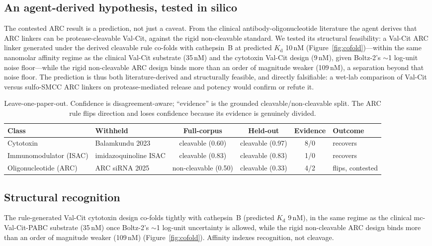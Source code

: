 \documentclass[10pt]{article}
\begin{document}
\subsection{An agent-derived hypothesis, tested in silico}
The contested ARC result is a prediction, not just a caveat. From the clinical antibody-oligonucleotide literature the agent derives that ARC linkers can be protease-cleavable Val-Cit, against the rigid non-cleavable standard. We tested its structural feasibility: a Val-Cit ARC linker generated under the derived cleavable rule co-folds with cathepsin~B at predicted $K_\mathrm{d}$ 10\,nM (Figure~\ref{fig:cofold})---within the same nanomolar affinity regime as the clinical Val-Cit substrate (35\,nM) and the cytotoxin Val-Cit design (9\,nM), given Boltz-2's $\sim$1 log-unit noise floor---while the rigid non-cleavable ARC design binds more than an order of magnitude weaker (109\,nM), a separation beyond that noise floor. The prediction is thus both literature-derived and structurally feasible, and directly falsifiable: a wet-lab comparison of Val-Cit versus sulfo-SMCC ARC linkers on protease-mediated release and potency would confirm or refute it.

\begin{table}[t]\centering\caption{Leave-one-paper-out. Confidence is disagreement-aware; ``evidence'' is the grounded cleavable/non-cleavable split. The ARC rule flips direction and loses confidence because its evidence is genuinely divided.}\label{tab:heldout}\footnotesize
\setlength{\tabcolsep}{4pt}
\begin{tabular}{l l c c c l}\toprule
Class & Withheld & Full-corpus & Held-out & Evidence & Outcome \\ \midrule
Cytotoxin & Balamkundu 2023 & cleavable (0.60) & cleavable (0.97) & 8/0 & recovers \\
Immunomodulator (ISAC) & imidazoquinoline ISAC & cleavable (0.83) & cleavable (0.83) & 1/0 & recovers \\
Oligonucleotide (ARC) & ARC siRNA 2025 & non-cleavable (0.50) & cleavable (0.33) & 4/2 & flips, contested \\
\bottomrule\end{tabular}\end{table}

\subsection{Structural recognition}
The rule-generated Val-Cit cytotoxin design co-folds tightly with cathepsin~B (predicted $K_\mathrm{d}$ 9\,nM), in the same regime as the clinical mc-Val-Cit-PABC substrate (35\,nM) once Boltz-2's $\sim$1 log-unit uncertainty is allowed, while the rigid non-cleavable ARC design binds more than an order of magnitude weaker (109\,nM) (Figure~\ref{fig:cofold}). Affinity indexes recognition, not cleavage.
\end{document}
